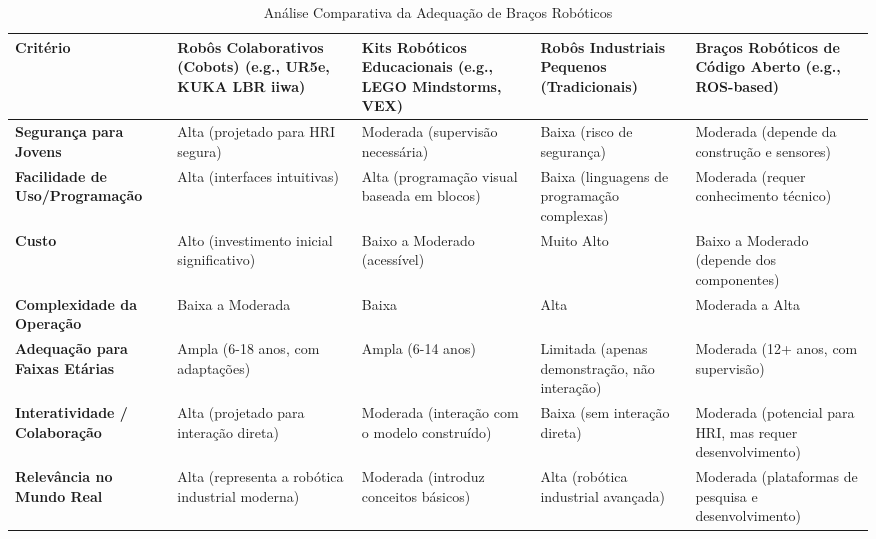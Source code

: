 \documentclass[%
  a4paper,%
  12pt,%
  fleqn,%
  english,%
  brazilian,%
]{article}
\begin{document}
\begin{table}[h]
\caption{Análise Comparativa da Adequação de Braços Robóticos}
\label{tab:analise_comparativa_publico}
\begin{tabular}{@{}p{3cm}p{3cm}p{3cm}p{3cm}p{3cm}@{}}
\toprule
\textbf{Critério}                      & \textbf{Robôs Colaborativos (Cobots) (e.g., UR5e, KUKA LBR iiwa)} & \textbf{Kits	Robóticos Educacionais (e.g., LEGO Mindstorms, VEX)} & \textbf{Robôs Industriais Pequenos (Tradicionais)} & \textbf{Braços Robóticos de Código Aberto (e.g., ROS-based)} \\ \midrule
\textbf{Segurança para Jovens}         & Alta	(projetado para HRI segura)                                  & Moderada (supervisão necessária)                                  & Baixa (risco de segurança)                         & Moderada (depende da construção e sensores)                  \\
\textbf{Facilidade de Uso/Programação} & Alta	(interfaces intuitivas)                                      & Alta	(programação visual baseada em blocos)                       & Baixa (linguagens de programação complexas)        & Moderada (requer conhecimento técnico)                       \\
\textbf{Custo}                         & Alto	(investimento inicial significativo)                         & Baixo a Moderado (acessível)                                      & Muito Alto                                         & Baixo a Moderado (depende dos componentes)                   \\
\textbf{Complexidade da Operação}      & Baixa a Moderada                                                  & Baixa                                                             & Alta                                               & Moderada a Alta                                              \\
\textbf{Adequação para Faixas Etárias} & Ampla (6-18 anos, com adaptações)                                 & Ampla (6-14 anos)                                                 & Limitada (apenas demonstração, não interação)      & Moderada (12+ anos, com supervisão)                          \\
\textbf{Interatividade / Colaboração}    & Alta	(projetado para interação direta)                            & Moderada (interação com o modelo construído)                      & Baixa (sem interação direta)                       & Moderada (potencial para HRI, mas requer desenvolvimento)    \\
\textbf{Relevância no Mundo Real}      & Alta	(representa a robótica industrial moderna)                   & Moderada (introduz conceitos básicos)                             & Alta	(robótica industrial avançada)                & Moderada (plataformas de pesquisa e desenvolvimento)         \\ \bottomrule
\end{tabular}
\end{table}
\end{document}
